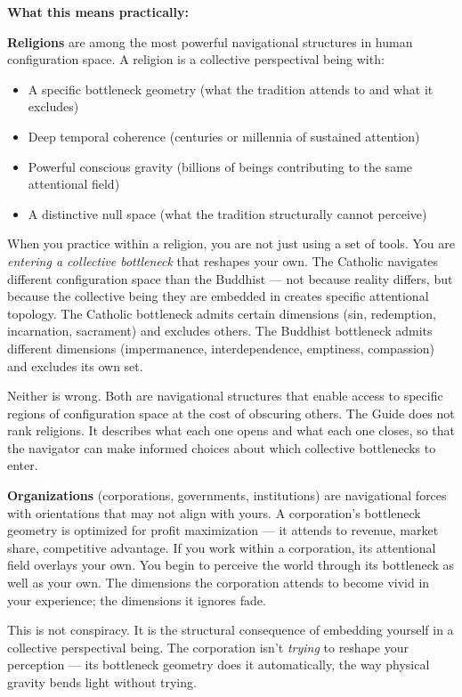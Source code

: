 \textbf{What this means practically:}


\textbf{Religions} are among the most powerful navigational structures in human configuration space. A religion is a collective perspectival being with:

\begin{itemize}[nosep,leftmargin=*]
  \item A specific bottleneck geometry (what the tradition attends to and what it excludes)
  \item Deep temporal coherence (centuries or millennia of sustained attention)
  \item Powerful conscious gravity (billions of beings contributing to the same attentional field)
  \item A distinctive null space (what the tradition structurally cannot perceive)
\end{itemize}


When you practice within a religion, you are not just using a set of tools. You are \textit{entering a collective bottleneck} that reshapes your own. The Catholic navigates different configuration space than the Buddhist — not because reality differs, but because the collective being they are embedded in creates specific attentional topology. The Catholic bottleneck admits certain dimensions (sin, redemption, incarnation, sacrament) and excludes others. The Buddhist bottleneck admits different dimensions (impermanence, interdependence, emptiness, compassion) and excludes its own set.


Neither is wrong. Both are navigational structures that enable access to specific regions of configuration space at the cost of obscuring others. The Guide does not rank religions. It describes what each one opens and what each one closes, so that the navigator can make informed choices about which collective bottlenecks to enter.


\textbf{Organizations} (corporations, governments, institutions) are navigational forces with orientations that may not align with yours. A corporation's bottleneck geometry is optimized for profit maximization — it attends to revenue, market share, competitive advantage. If you work within a corporation, its attentional field overlays your own. You begin to perceive the world through its bottleneck as well as your own. The dimensions the corporation attends to become vivid in your experience; the dimensions it ignores fade.


This is not conspiracy. It is the structural consequence of embedding yourself in a collective perspectival being. The corporation isn't \textit{trying} to reshape your perception — its bottleneck geometry does it automatically, the way physical gravity bends light without trying.


